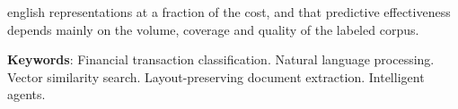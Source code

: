 \begin{resumo}[Abstract]
\begin{otherlanguage*}{english}
representations at a fraction of the cost, and that predictive effectiveness depends mainly on the volume, coverage and quality of the labeled corpus.

   \vspace{\onelineskip}

   \noindent
   \textbf{Keywords}: Financial transaction classification. Natural language processing. Vector similarity search. Layout-preserving document extraction. Intelligent agents.
 \end{otherlanguage*}
\end{resumo}
